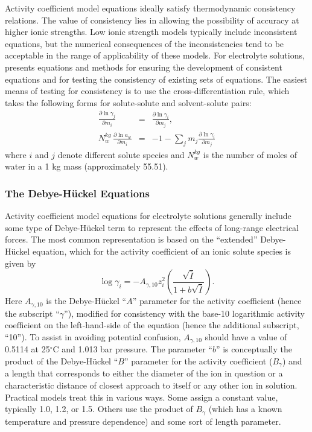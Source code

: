 Activity coefficient model equations ideally satisfy thermodynamic
consistency relations. The value of consistency lies in allowing the
possibility of accuracy at higher ionic strengths. Low ionic strength
models typically include inconsistent equations, but the numerical
consequences of the inconsistencies tend to be acceptable in the range
of applicability of these models. For electrolyte solutions,
\citet{wolery-1990} presents equations and methods for ensuring the
development of 
consistent equations and for testing the consistency of existing sets
of equations. The easiest means of testing for consistency is to use
the cross-differentiation rule, which takes the following forms for
solute-solute and solvent-solute pairs:
\begin{eqnarray}
\frac{\partial\ln\gamma_{j}}{\partial m_{i}} &=&\frac{\partial\ln\gamma_{i}}{\partial m_{j}}, \\
N_{w}^{kg} \, \frac{\partial \ln a_{w}}{\partial m_{i} } &=&-1-\sum _{j}m_{j} \frac{\partial \ln \gamma_{i}}{\partial m_{j}}
\end{eqnarray}
where $i$ and $j$ denote different solute
species and $N_{w}^{kg}$ is the number of moles of water in a 1 kg mass
(approximately 55.51).

\subsubsection{The Debye-H\"{u}ckel Equations} 
\label{sec:debyehuckel}

Activity coefficient model equations for electrolyte solutions
generally include some type of Debye-H\"{u}ckel term to represent the
effects of long-range electrical forces. The most common
representation is based on the ``extended'' Debye-H\"{u}ckel equation,
which for the activity coefficient of an ionic solute species is given
by
%
\begin{equation}
   \log \gamma _{i} = - A_{\gamma ,10} z_{i}^{2} 
                       \left( \frac{\sqrt{ \bar{I} }}{1 + b \sqrt{\bar{I}}} \right).
\end{equation}
%
Here $A_{\gamma ,10} $ is the Debye-H\"{u}ckel ``$A$'' parameter for the
activity coefficient (hence the subscript ``$\gamma$''), modified for
consistency with the base-10 logarithmic activity coefficient on the
left-hand-side of the equation (hence the additional subscript,
``10''). To assist in avoiding potential confusion, $A_{\gamma ,10}$
should have a value of 0.5114 at
25${}^\circ$C and 1.013 bar pressure. The parameter ``$b$'' is
conceptually the product of the Debye-H\"{u}ckel ``$B$'' parameter for
the activity coefficient ($B_{\gamma}$) and a length that
corresponds to either the diameter of the ion in question or a
characteristic distance of closest approach to itself or any other ion
in solution. Practical models treat this in various ways. Some assign
a constant value, typically 1.0, 1.2, or 1.5. Others use the product
of $B_{\gamma}$ (which has a known temperature and pressure
dependence) and some sort of length parameter.

